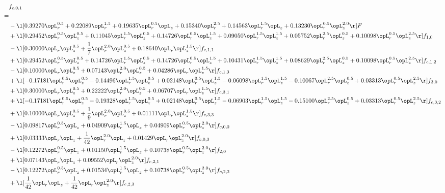 \begin{alignat}{2} 
\label{eq:f_01_2} 
& f_{c,0,1} \nonumber \\ 
 = \\ 
& - \l[  0.39270 \opL_r^{0.5} +  0.22089 \opL_r^{1.5} +  0.19635 \opL_r^{0.5} \opL_z +  0.15340 \opL_r^{2.5} +  0.14563 \opL_r^{1.5} \opL_z +  0.13230 \opL_r^{0.5} \opL_z^{2.0}  \r] F \nonumber \\ 
& + \l[  0.29452 \opL_r^{0.5} \opL_z^{0.5} +  0.11045 \opL_r^{1.5} \opL_z^{0.5} +  0.14726 \opL_r^{0.5} \opL_z^{1.5} +  0.09050 \opL_r^{1.5} \opL_z^{1.5} +  0.05752 \opL_r^{2.5} \opL_z^{0.5} +  0.10098 \opL_r^{0.5} \opL_z^{2.5}  \r] f_{1,0} \nonumber \\ 
& - \l[  0.30000 \opL_r \opL_z^{0.5} + \frac{1}{7} \opL_r^{2.0} \opL_z^{0.5} +  0.18640 \opL_r \opL_z^{1.5}  \r] f_{c,1,1} \nonumber \\ 
& + \l[  0.29452 \opL_r^{0.5} \opL_z^{0.5} +  0.14726 \opL_r^{1.5} \opL_z^{0.5} +  0.14726 \opL_r^{0.5} \opL_z^{1.5} +  0.10431 \opL_r^{1.5} \opL_z^{1.5} +  0.08629 \opL_r^{2.5} \opL_z^{0.5} +  0.10098 \opL_r^{0.5} \opL_z^{2.5}  \r] f_{c,1,2} \nonumber \\ 
& - \l[  0.10000 \opL_r \opL_z^{0.5} +  0.07143 \opL_r^{2.0} \opL_z^{0.5} +  0.04286 \opL_r \opL_z^{1.5}  \r] f_{c,1,3} \nonumber \\ 
& + \l[  -0.17181 \opL_r^{0.5} \opL_z^{0.5}   -0.14496 \opL_r^{1.5} \opL_z^{0.5} +  0.02148 \opL_r^{0.5} \opL_z^{1.5}   -0.06098 \opL_r^{1.5} \opL_z^{1.5}   -0.10067 \opL_r^{2.5} \opL_z^{0.5} +  0.03313 \opL_r^{0.5} \opL_z^{2.5}  \r] f_{3,0} \nonumber \\ 
& + \l[  0.30000 \opL_r \opL_z^{0.5} +  0.22222 \opL_r^{2.0} \opL_z^{0.5} +  0.06707 \opL_r \opL_z^{1.5}  \r] f_{c,3,1} \nonumber \\ 
& + \l[  -0.17181 \opL_r^{0.5} \opL_z^{0.5}   -0.19328 \opL_r^{1.5} \opL_z^{0.5} +  0.02148 \opL_r^{0.5} \opL_z^{1.5}   -0.06903 \opL_r^{1.5} \opL_z^{1.5}   -0.15100 \opL_r^{2.5} \opL_z^{0.5} +  0.03313 \opL_r^{0.5} \opL_z^{2.5}  \r] f_{c,3,2} \nonumber \\ 
& + \l[  0.10000 \opL_r \opL_z^{0.5} + \frac{1}{9} \opL_r^{2.0} \opL_z^{0.5} +  0.01111 \opL_r \opL_z^{1.5}  \r] f_{c,3,3} \nonumber \\ 
& - \l[  0.09817 \opL_r^{0.5} \opL_z +  0.04909 \opL_r^{1.5} \opL_z +  0.04909 \opL_r^{0.5} \opL_z^{2.0}  \r] f_{c,0,2} \nonumber \\ 
& + \l[  0.03333 \opL_r \opL_z + \frac{1}{42} \opL_r^{2.0} \opL_z +  0.01429 \opL_r \opL_z^{2.0}  \r] f_{c,0,3} \nonumber \\ 
& - \l[  0.12272 \opL_r^{0.5} \opL_z +  0.01150 \opL_r^{1.5} \opL_z +  0.10738 \opL_r^{0.5} \opL_z^{2.0}  \r] f_{2,0} \nonumber \\ 
& + \l[  0.07143 \opL_r \opL_z +  0.09552 \opL_r \opL_z^{2.0}  \r] f_{c,2,1} \nonumber \\ 
& - \l[  0.12272 \opL_r^{0.5} \opL_z +  0.01534 \opL_r^{1.5} \opL_z +  0.10738 \opL_r^{0.5} \opL_z^{2.0}  \r] f_{c,2,2} \nonumber \\ 
& + \l[ \frac{1}{42} \opL_r \opL_z + \frac{1}{42} \opL_r \opL_z^{2.0}  \r] f_{c,2,3} \nonumber \\ 
\end{alignat} 


